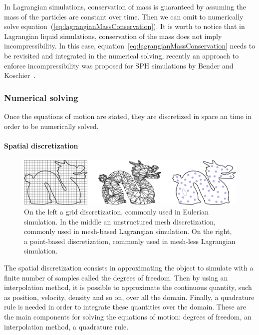 In Lagrangian simulations, conservation of mass is guaranteed by assuming the mass of the particles are constant over time. Then we can omit to numerically solve equation~(\ref{eq:lagrangianMassConservation}). It is worth to notice that in Lagrangian liquid simulations, conservation of the mass does not imply incompressibility. In this case, equation~\ref{eq:lagrangianMassConservation} needs to be revisited and integrated in the numerical solving, recently an approach to enforce incompressibility was proposed for SPH simulations by Bender and Koschier~\cite{Bender2015}.

\subsubsection{Numerical solving}

Once the equations of motion are stated, they are discretized in space an time in order to be numerically solved.

\paragraph{Spatial discretization}

\begin{figure}[!ht]
\centering
\includegraphics[scale=0.2]{images/continuum_mechanics/discretization.png}
\caption[STAR mechanics: Discretization]{\label{fig:discretization} On the left a grid discretization, commonly used in Eulerian simulation. In the middle an unstructured mesh discretization, commonly used in mesh-based Lagrangian simulation. On the right, a point-based discretization, commonly used in mesh-less Lagrangian simulation.}
\end{figure}

The spatial discretization consists in approximating the object to simulate with a finite number of samples called the degrees of freedom. Then by using an interpolation method, it is possible to approximate the continuous quantity, such as position, velocity, density and so on, over all the domain. Finally, a quadrature rule is needed in order to integrate these quantities over the domain. These are the main components for solving the equations of motion:
degrees of freedom, an interpolation method, a quadrature rule. 

